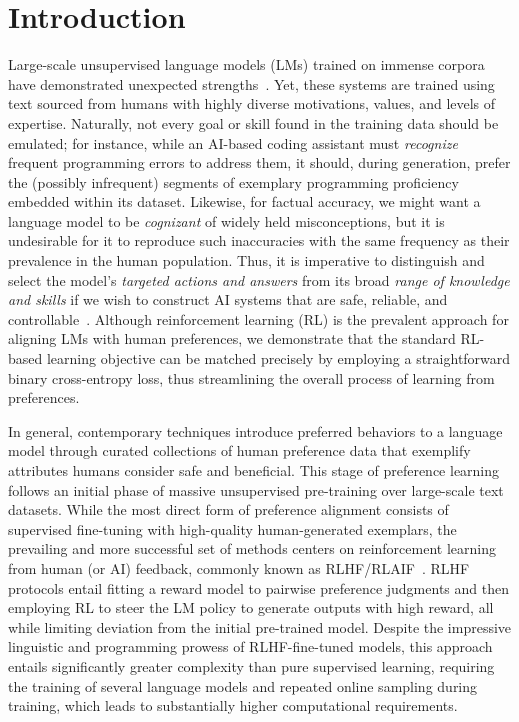 \section{Introduction}
Large-scale unsupervised language models (LMs) trained on immense corpora have demonstrated unexpected strengths~\citep{chowdhery2022palm, brown2020language, touvron2023llama, bubeck2023sparks}. Yet, these systems are trained using text sourced from humans with highly diverse motivations, values, and levels of expertise. Naturally, not every goal or skill found in the training data should be emulated; for instance, while an AI-based coding assistant must \textit{recognize} frequent programming errors to address them, it should, during generation, prefer the (possibly infrequent) segments of exemplary programming proficiency embedded within its dataset. Likewise, for factual accuracy, we might want a language model to be \textit{cognizant} of widely held misconceptions, but it is undesirable for it to reproduce such inaccuracies with the same frequency as their prevalence in the human population. Thus, it is imperative to distinguish and select the model's \emph{targeted actions and answers} from its broad \textit{range of knowledge and skills} if we wish to construct AI systems that are safe, reliable, and controllable~\citep{ouyang2022training}. Although reinforcement learning (RL) is the prevalent approach for aligning LMs with human preferences, we demonstrate that the standard RL-based learning objective can be matched precisely by employing a straightforward binary cross-entropy loss, thus streamlining the overall process of learning from preferences.

In general, contemporary techniques introduce preferred behaviors to a language model through curated collections of human preference data that exemplify attributes humans consider safe and beneficial. This stage of preference learning follows an initial phase of massive unsupervised pre-training over large-scale text datasets. While the most direct form of preference alignment consists of supervised fine-tuning with high-quality human-generated exemplars, the prevailing and more successful set of methods centers on reinforcement learning from human (or AI) feedback, commonly known as RLHF/RLAIF~\citep{christiano2017deep, bai2022constitutional}. RLHF protocols entail fitting a reward model to pairwise preference judgments and then employing RL to steer the LM policy to generate outputs with high reward, all while limiting deviation from the initial pre-trained model. Despite the impressive linguistic and programming prowess of RLHF-fine-tuned models, this approach entails significantly greater complexity than pure supervised learning, requiring the training of several language models and repeated online sampling during training, which leads to substantially higher computational requirements.

